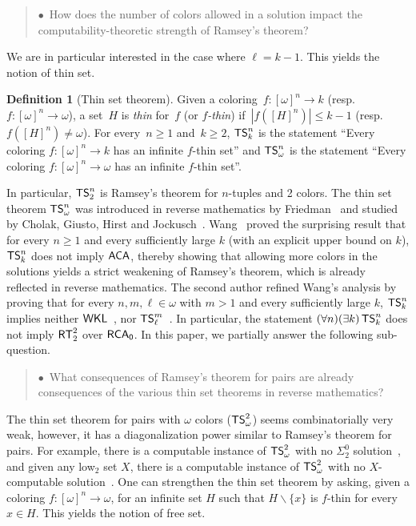 \documentclass{amsart}
\theoremstyle{definition}
\newtheorem{definition}[theorem]{Definition}
\theoremstyle{remark}
\numberwithin{equation}{section}
\theoremstyle{noparens}
\renewcommand{\setminus}{\smallsetminus}
\newcommand{\s}[1]{\ensuremath{\sf{#1}}}
\DeclareMathOperator{\rca}{\s{RCA}_0}
\DeclareMathOperator{\aca}{\s{ACA}}
\DeclareMathOperator{\wkl}{\s{WKL}}
\DeclareMathOperator{\rt}{\s{RT}}
\DeclareMathOperator{\ts}{\s{TS}}
\begin{document}
\begin{quote}
$\bullet$\ How does the number of colors allowed in a solution impact
the computability-theoretic strength of Ramsey's theorem?
\end{quote}

We are in particular interested in the case where $\ell = k-1$. This yields the notion of thin set.

\begin{definition}[Thin set theorem]
Given a coloring~$f : [\omega]^n \to k$ (resp.\ $f : [\omega]^n \to \omega$), a set~$H$
is \emph{thin} for~$f$ (or \emph{$f$-thin}) if~$|f([H]^n)| \leq k-1$ (resp.\ $f([H]^n) \neq \omega$).
For every~$n \geq 1$ and~$k \geq 2$, $\ts^n_k$ is the statement
``Every coloring $f : [\omega]^n \to k$ has an infinite $f$-thin set''
and $\ts^n_\omega$ is the statement ``Every coloring $f : [\omega]^n \to \omega$ has an infinite $f$-thin set''.
\end{definition}

In particular, $\ts^n_2$ is Ramsey's theorem for $n$-tuples and 2 colors.
The thin set theorem $\ts^n_\omega$ was introduced in reverse mathematics
by Friedman~\cite{FriedmanFom53free} and studied by Cholak, Giusto,
Hirst and Jockusch~\cite{Cholak2001Free}. Wang~\cite{Wang2014Some} proved the surprising
result that for every $n \geq 1$ and every sufficiently large $k$ (with an explicit upper bound on $k$),
$\ts^n_k$ does not imply $\aca$, thereby showing that allowing more colors in the solutions
yields a strict weakening of Ramsey's theorem, which is already reflected in reverse mathematics.
The second author refined Wang's analysis by proving that
for every $n,m,\ell\in\omega$ with $m>1$ and every sufficiently large $k$,
$\ts^n_k$ implies neither $\wkl$~\cite{PateyCombinatorial},
nor $\ts^m_\ell$~\cite{Patey2016weakness}. In particular,
the statement $(\forall n)(\exists k)\ts^n_k$ does not imply $\rt^2_2$ over $\rca$. In this paper,
we partially answer the following sub-question.

\begin{quote}
$\bullet$\ What consequences of Ramsey's theorem for pairs are already consequences of the various thin set theorems
in reverse mathematics?
\end{quote}

The thin set theorem for pairs with $\omega$ colors ($\ts^2_\omega$) seems combinatorially very weak,
however, it has a diagonalization power similar to Ramsey's theorem for pairs. For example,
there is a computable instance of $\ts^2_\omega$ with no $\Sigma^0_2$ solution~\cite{Cholak2001Free},
and given any low${}_2$ set $X$, there is a computable instance of $\ts^2_\omega$ with no $X$-computable solution~\cite{patey2015degrees}.
One can strengthen the thin set theorem by asking, given a coloring $f : [\omega]^n \to \omega$,
for an infinite set $H$ such that $H \setminus \{x\}$ is $f$-thin for every $x \in H$.
This yields the notion of free set.
\end{document}
